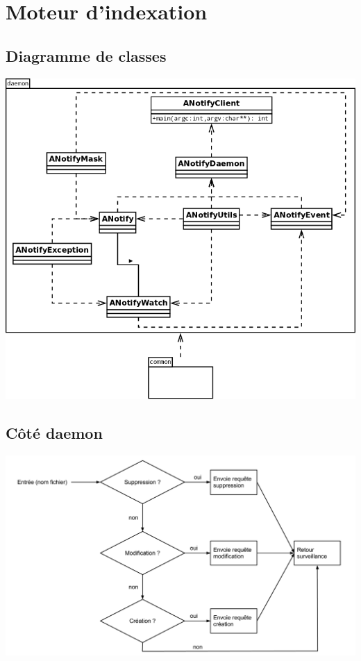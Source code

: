 \documentclass[a4paper,12pt]{report}
\begin{document}
\section{Moteur d'indexation}

\subsection{Diagramme de classes}\label{diagramme_classes_mi}
\begin{center}
\includegraphics[scale=0.4]{"images/diagramme_classes_mi"}
\end{center}

\newpage
\subsection{Côté daemon}\label{decision-daemon}
\begin{center}
\includegraphics[scale=0.37]{"images/decision_mi"}
\end{center}
\end{document}

